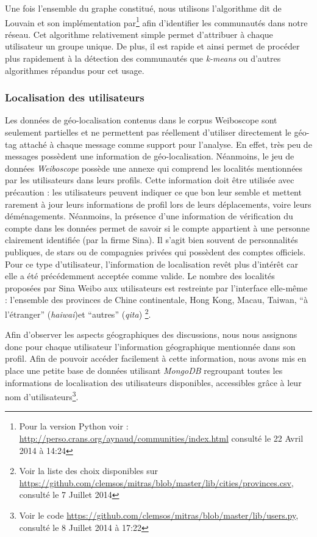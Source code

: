     Une fois l{\textquoteright}ensemble du graphe constitué, nous utilisons l{\textquoteright}algorithme dit de Louvain et son implémentation par\citep{Blondel2008}\footnote{Pour la version Python voir : \url{http://perso.crans.org/aynaud/communities/index.html} consulté le 22 Avril 2014 à 14:24} afin d'identifier les communautés dans notre réseau. Cet algorithme relativement simple permet d'attribuer à chaque utilisateur un groupe unique. De plus, il est rapide et ainsi permet de procéder plus rapidement à la détection des communautés que \textit{k-means} ou d'autres algorithmes répandus pour cet usage.

\subsubsection[Localisation des utilisateurs]{Localisation des utilisateurs}
\label{sec:geoloc}
    Les données de géo-localisation contenus dans le corpus Weiboscope sont seulement partielles et ne permettent pas réellement d'utiliser directement le géo-tag attaché à chaque message comme support pour l'analyse. En effet, très peu de messages possèdent une information de géo-localisation. Néanmoins, le jeu de données \textit{Weiboscope} possède une annexe qui comprend les localités mentionnées par les utilisateurs dans leurs profils. Cette information doit être utilisée avec précaution : les utilisateurs peuvent indiquer ce que bon leur semble et mettent rarement à jour leurs informations de profil lors de leurs déplacements, voire leurs déménagements. Néanmoins, la présence d'une information de vérification du compte dans les données permet de savoir si le compte appartient à une personne clairement identifiée (par la firme Sina). Il s'agit bien souvent de personnalités publiques, de stars ou de compagnies privées qui possèdent des comptes officiels. Pour ce type d'utilisateur, l'information de localisation revêt plus d'intérêt car elle a été  précédemment acceptée comme valide. Le nombre des localités proposées par Sina Weibo aux utilisateurs est restreinte par l{\textquoteright}interface  elle-même : l{\textquoteright}ensemble des provinces de Chine continentale, Hong Kong, Macau, Taiwan, {\textquotedblleft}à l{\textquoteright}étranger{\textquotedblright} (\textit{haiwai})et {\textquotedblleft}autres{\textquotedblright} (\textit{qita}) \footnote{Voir la liste des choix disponibles sur \url{https://github.com/clemsos/mitras/blob/master/lib/cities/provinces.csv}, consulté le 7 Juillet 2014}.

    Afin d'observer les aspects géographiques des discussions, nous nous assignons donc pour chaque utilisateur l{\textquoteright}information géographique mentionnée dans son profil. Afin de pouvoir accéder facilement à cette information, nous avons mis en place une petite base de données utilisant \textit{MongoDB} regroupant toutes les informations de localisation des utilisateurs disponibles, accessibles grâce à leur nom d'utilisateurs\footnote{Voir le code \url{https://github.com/clemsos/mitras/blob/master/lib/users.py}, consulté le 8 Juillet 2014 à 17:22}.


